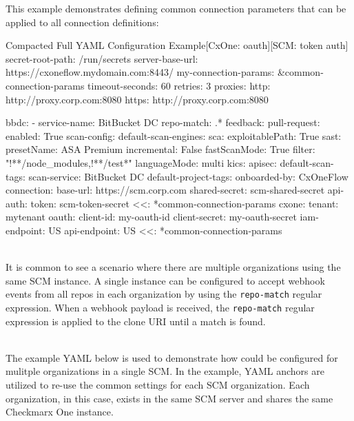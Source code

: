 This example demonstrates defining common connection parameters that can be applied
to all connection definitions:

\begin{code}{Compacted Full YAML Configuration Example}{[CxOne: oauth]}{[SCM: token auth]}
secret-root-path: /run/secrets
server-base-url: https://cxoneflow.mydomain.com:8443/
my-connection-params: &common-connection-params
    timeout-seconds: 60
    retries: 3
    proxies:
        http: http://proxy.corp.com:8080
        https: http://proxy.corp.com:8080


bbdc:
    - service-name: BitBucket DC
      repo-match: .*
      feedback:
        pull-request:
            enabled: True
      scan-config:
          default-scan-engines:
              sca:
                  exploitablePath: True
              sast:
                  presetName: ASA Premium
                  incremental: False
                  fastScanMode: True
                  filter: "!**/node_modules,!**/test*"
                  languageMode: multi
              kics:
              apisec:
          default-scan-tags:
              scan-service: BitBucket DC
          default-project-tags:
              onboarded-by: CxOneFlow
      connection:
          base-url: https://scm.corp.com
          shared-secret: scm-shared-secret
          api-auth:
              token: scm-token-secret
          <<: *common-connection-params
      cxone:
          tenant: mytenant
          oauth:
              client-id: my-oauth-id
              client-secret: my-oauth-secret
          iam-endpoint: US
          api-endpoint: US
          <<: *common-connection-params
\end{code}


\noindent\\It is common to see a scenario where there are multiple organizations
using the same SCM instance.  A single \cxoneflow instance can be configured to accept
webhook events from all repos in each organization by using the \texttt{repo-match}
regular expression.  When a webhook payload is received, the \texttt{repo-match}
regular expression is applied to the clone URI until a match is found.

\noindent\\The example YAML below is used to demonstrate how \cxoneflow could be configured
for mulitple organizations in a single SCM. In the example, YAML anchors are utilized to 
re-use the common settings for each SCM organization.  Each organization, in this case, 
exists in the same SCM server and shares the same Checkmarx One instance.

